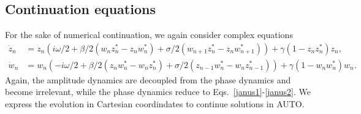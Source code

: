\documentclass[aps,pre,amsmath,amssymb,floatfix,onecolumn,notitlepage,10pt]{revtex4-1}
\begin{document}
\subsection{Continuation equations}
For the sake of numerical continuation, we again consider complex equations
\begin{align}
\dot z_n &= z_n\left( i\omega/2 + \beta/2\left(w_nz_n^*-z_nw_n^*\right) + \sigma/2\left(w_{n+1}z_n^*-z_nw_{n+1}^*\right)\right) + \gamma\left(1-z_nz_n^*\right)z_n, \label{eom1} \\
\dot w_n &= w_n\left( -i\omega/2 + \beta/2\left(z_nw_n^*-w_nz_n^*\right) + \sigma/2\left(z_{n-1}w_n^*-w_nz_{n-1}^*\right)\right) + \gamma\left(1-w_nw_n^*\right)w_n. \label{eom2}
\end{align}
Again, the amplitude dynamics are decoupled from the phase dynamics and become irrelevant, while the phase dynamics reduce to Eqs.~\eqref{janus1}-\eqref{janus2}. We express the evolution in Cartesian coordindates to continue solutions in AUTO.
\end{document}

